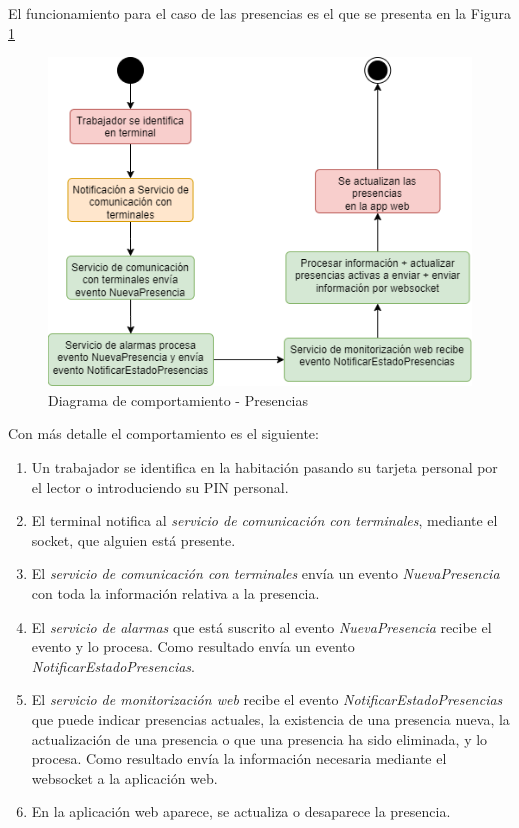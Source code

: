 \newpage
El funcionamiento para el caso de las presencias es el que se presenta en la Figura \ref{fig:flujograma-presencias}

\begin{figure}[H]
    \centering
    \includegraphics[width=12cm]{Imagenes/Flujograma-presencias.png}
    \caption{Diagrama de comportamiento - Presencias}
    \label{fig:flujograma-presencias}
\end{figure}

Con más detalle el comportamiento es el siguiente:
\begin{enumerate}
	\item Un trabajador se identifica en la habitación pasando su tarjeta personal por el lector o introduciendo su PIN personal.
	\item El terminal notifica al \textit{servicio de comunicación con terminales}, mediante el socket, que alguien está presente.
	\item El \textit{servicio de comunicación con terminales} envía un evento \textit{NuevaPresencia} con toda la información relativa a la presencia.
	\item El \textit{servicio de alarmas} que está suscrito al evento \textit{NuevaPresencia} recibe el evento y lo procesa. Como resultado envía un evento \textit{NotificarEstadoPresencias}.
	\item El \textit{servicio de monitorización web} recibe el evento \textit{NotificarEstadoPresencias} que puede indicar presencias actuales, la existencia de una presencia nueva, la actualización de una presencia o que una presencia ha sido eliminada, y lo procesa. Como resultado envía la información necesaria mediante el websocket a la aplicación web.
	\item En la aplicación web aparece, se actualiza o desaparece la presencia.
\end{enumerate}

